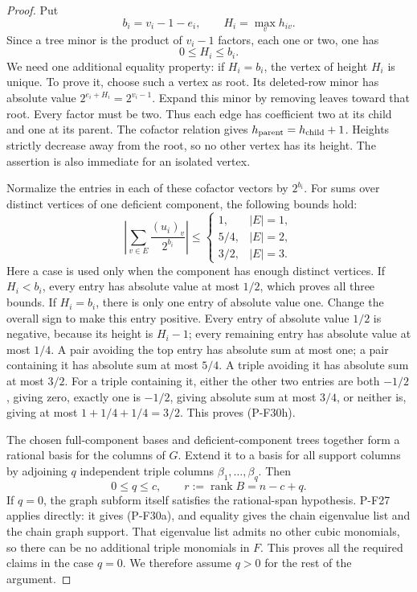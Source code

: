 \begin{proof}
Put
\[
 b_i=v_i-1-e_i,\qquad H_i=\max_v h_{iv}.
\]
Since a tree minor is the product of $v_i-1$
factors, each one or two, one has
\[
 0\le H_i\le b_i.
 \tag{P-F30g}
\]
We need one additional equality property: if
$H_i=b_i$, the vertex of height $H_i$ is unique.
To prove it, choose such a vertex as root.
Its deleted-row minor has absolute value
$2^{e_i+H_i}=2^{v_i-1}$. Expand this minor by
removing leaves toward that root. Every factor
must be two. Thus each edge has coefficient
two at its child and one at its parent.
The cofactor relation gives
$h_{\rm parent}=h_{\rm child}+1$.
Heights strictly decrease away from the root,
so no other vertex has its height.
The assertion is also immediate for an isolated vertex.

Normalize the entries in each of these cofactor
vectors by $2^{b_i}$. For sums over distinct
vertices of one deficient component, the following
bounds hold:
\[
 \left|\sum_{v\in E}\frac{(u_i)_v}{2^{b_i}}\right|
 \le
 \begin{cases}
  1,&|E|=1,\\
  5/4,&|E|=2,\\
  3/2,&|E|=3.
 \end{cases}
 \tag{P-F30h}
\]
Here a case is used only when the component has
enough distinct vertices. If $H_i<b_i$, every
entry has absolute value at most $1/2$, which
proves all three bounds. If $H_i=b_i$, there is
only one entry of absolute value one. Change
the overall sign to make this entry positive.
Every entry of absolute value $1/2$ is negative,
because its height is $H_i-1$; every remaining
entry has absolute value at most $1/4$.
A pair avoiding the top entry has absolute sum
at most one; a pair containing it has absolute
sum at most $5/4$. A triple avoiding it has
absolute sum at most $3/2$. For a triple containing
it, either the other two entries are both $-1/2$,
giving zero, exactly one is $-1/2$, giving absolute
sum at most $3/4$, or neither is, giving at most
$1+1/4+1/4=3/2$. This proves (P-F30h).

The chosen full-component bases and deficient-component
trees together form a rational basis for the columns
of $G$. Extend it to a basis for all support columns
by adjoining $q$ independent triple columns
$\beta_1,\ldots,\beta_q$. Then
\[
 0\le q\le c,\qquad
 r:=\operatorname{rank}B=n-c+q.
 \tag{P-F30i}
\]
If $q=0$, the graph subform itself satisfies the
rational-span hypothesis. P-F27 applies directly:
it gives (P-F30a), and equality gives the chain
eigenvalue list and the chain graph support.
That eigenvalue list admits no other cubic
monomials, so there can be no additional triple
monomials in $F$. This proves all the required
claims in the case $q=0$.
We therefore assume $q>0$ for the rest of the argument.


\end{proof}
